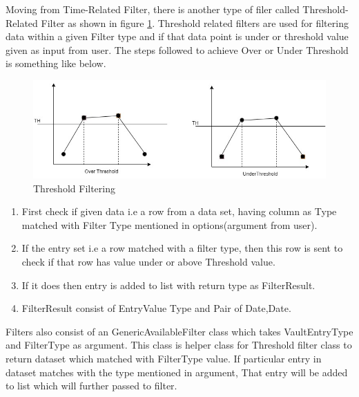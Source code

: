 \documentclass[article,type=msc,colorback,accentcolor=tud9c,twoside,11pt]{tudthesis}
\begin{document}
	Moving from Time-Related Filter, there is another type of filer called Threshold-Related Filter as shown in figure \ref{fig:Threshold}. Threshold related filters are used for filtering data within a given Filter type and if that data point is under or threshold value given as input from user. The steps followed to achieve Over or Under Threshold is something like below.
	\begin{figure}[h]
		\centering
		\includegraphics[scale=0.7]{Threshold.jpg}
		\caption{Threshold Filtering}
		\label{fig:Threshold}
	\end{figure}
	\begin{enumerate}
		\item First check if given data i.e a row from a data set, having column as Type matched with Filter Type mentioned in options(argument from user).
		\item If the entry set i.e a row matched with a filter type, then this row is sent to check if that row has value under or above Threshold value.
		\item If it does then entry is added to list with return type as FilterResult.
		\item FilterResult consist of EntryValue Type and Pair of Date,Date.
	\end{enumerate}
	Filters also consist of an GenericAvailableFilter class which takes VaultEntryType and FilterType as argument. This class is helper class for Threshold filter class to return dataset which matched with FilterType value. If particular entry in dataset matches with the type mentioned in argument, That entry will be added to list which will further passed to filter.
\end{document}
